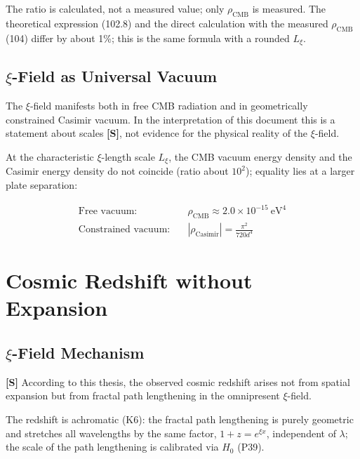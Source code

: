 	The ratio is calculated, not a measured value; only $\rho_{\text{CMB}}$ is measured. The theoretical expression (102.8) and the direct calculation with the measured $\rho_{\text{CMB}}$ (104) differ by about 1\%; this is the same formula with a rounded $L_\xi$.
	
	\subsection{$\xi$-Field as Universal Vacuum}
	
	\begin{important}
		The $\xi$-field manifests both in free CMB radiation and in geometrically constrained Casimir vacuum. In the interpretation of this document this is a statement about scales \textbf{[S]}, not evidence for the physical reality of the $\xi$-field.
	\end{important}
	
	At the characteristic $\xi$-length scale $L_\xi$, the CMB vacuum energy density and the Casimir energy density do not coincide (ratio about $10^2$); equality lies at a larger plate separation:
	
	\begin{align}
		\text{Free vacuum:} \quad &\rho_{\text{CMB}} \approx 2.0 \times 10^{-15}\ \text{eV}^4 \\
		\text{Constrained vacuum:} \quad &|\rho_{\text{Casimir}}| = \frac{\pi^2}{720 d^4}
	\end{align}
	
	\section{Cosmic Redshift without Expansion}
	
	\subsection{$\xi$-Field Mechanism}
	
	\begin{revolutionary}[Thesis]
		\textbf{[S]} According to this thesis, the observed cosmic redshift arises not from spatial expansion but from fractal path lengthening in the omnipresent $\xi$-field.
	\end{revolutionary}
	
	The redshift is achromatic (K6): the fractal path lengthening is purely geometric and stretches all wavelengths by the same factor, $1+z = e^{\xi x}$, independent of $\lambda$; the scale of the path lengthening is calibrated via $H_0$ (P39).
	
